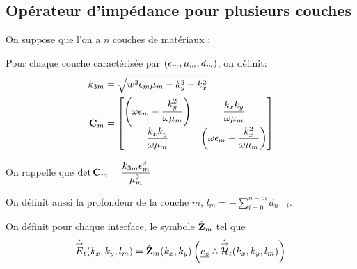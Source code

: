 
    \subsection{Opérateur d'impédance pour plusieurs couches}
        On suppose que l'on a $n$ couches de matériaux : 

        \begin{figure}[h!btp]
            \centering
            \begin{tikzpicture}
                
            \end{tikzpicture}
        \end{figure}

        Pour chaque couche caractérisée par $(\eps_m,\mu_m,d_m)$, on définit:
        \begin{align}
        k_{3m} &= \sqrt{w^2\eps_m\mu_m - k_y^2 - k_x^2}
        \\
        \mC_m &=
            \begin{bmatrix}
                \left(\w\eps_m-\frac{k_y^2}{\w\mu_m}\right) & \frac{k_xk_y}{\w\mu_m}\\
                \frac{k_xk_y}{\w\mu_m} & \left(\w\eps_m-\frac{k_x^2}{\w\mu_m}\right)
            \end{bmatrix}
        \end{align}

        On rappelle que $\det{\mC_m} = \frac{k_{3m}\eps_m^2}{\mu_m^2}$

        On définit aussi la profondeur de la couche $m$, $l_m = -\sum_{i=0}^{n-m} d_{n-i} $. 

        \begin{defn}
            On définit pour chaque interface, le symbole $\hat \mZ_m$ tel que
            \begin{equation}
                \hat \vE_t(k_x,k_y,l_m) = \hat \mZ_m(k_x,k_y) \left(\v{e_z} \pvect \hat \vH_t(k_x,k_y,l_m)\right)
            \end{equation}
        \end{defn}

